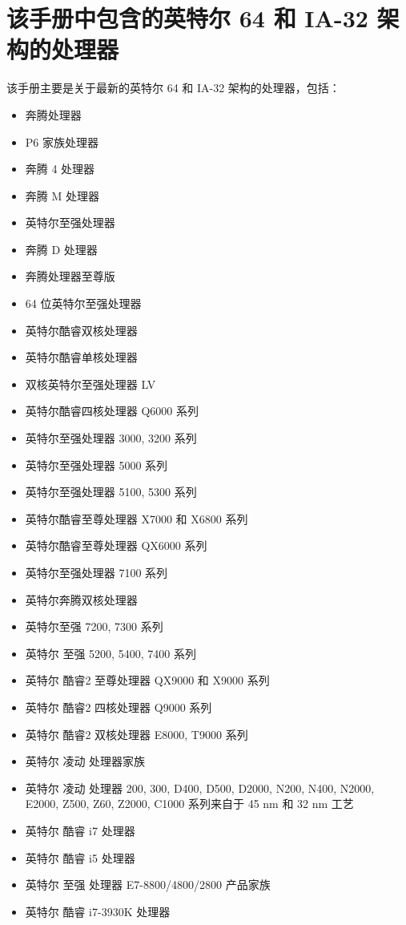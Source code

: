 \section{该手册中包含的英特尔 64 和 IA-32 架构的处理器}
该手册主要是关于最新的英特尔 64 和 IA-32 架构的处理器，包括：
\begin{itemize}
	\setlength\itemsep{-0.3em}
	\item 奔腾处理器
	\item P6 家族处理器
	\item 奔腾 4 处理器
	\item 奔腾 M 处理器
	\item 英特尔至强处理器
	\item 奔腾 D 处理器
	\item 奔腾处理器至尊版
	\item 64 位英特尔至强处理器
	\item 英特尔酷睿双核处理器
	\item 英特尔酷睿单核处理器
	\item 双核英特尔至强处理器 LV
	\item 英特尔酷睿四核处理器 Q6000 系列
	\item 英特尔至强处理器 3000, 3200 系列
	\item 英特尔至强处理器 5000 系列
	\item 英特尔至强处理器 5100, 5300 系列
	\item 英特尔酷睿至尊处理器 X7000 和 X6800 系列
	\item 英特尔酷睿至尊处理器 QX6000 系列
	\item 英特尔至强处理器 7100 系列
	\item 英特尔奔腾双核处理器
	\item 英特尔至强 7200, 7300 系列
	\item 英特尔 至强 5200, 5400, 7400 系列
	\item 英特尔 酷睿2 至尊处理器 QX9000 和 X9000 系列
	\item 英特尔 酷睿2 四核处理器 Q9000 系列
	\item 英特尔 酷睿2 双核处理器 E8000, T9000 系列
	\item 英特尔 凌动 处理器家族
	\item 英特尔 凌动 处理器 200, 300, D400, D500, D2000, N200, N400, N2000, E2000, Z500, Z60, Z2000, C1000 系列来自于 45 nm 和 32 nm 工艺
	\item 英特尔 酷睿 i7 处理器
	\item 英特尔 酷睿 i5 处理器
	\item 英特尔 至强 处理器 E7-8800/4800/2800 产品家族
	\item 英特尔 酷睿 i7-3930K 处理器

\end{itemize}
